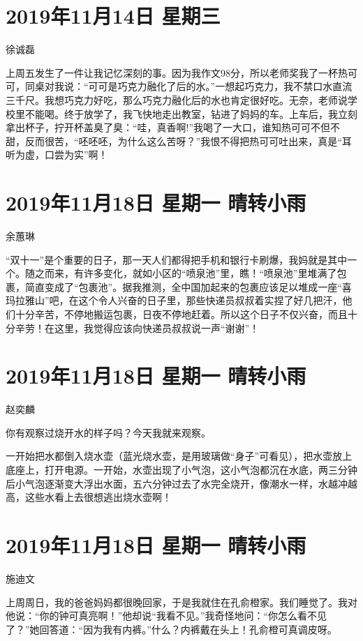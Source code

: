 \section{2019年11月14日 星期三}

徐诚磊

上周五发生了一件让我记忆深刻的事。因为我作文98分，所以老师奖我了一杯热可可，同桌对我说：``可可是巧克力融化了后的水。''一想起巧克力，我不禁口水直流三千尺。我想巧克力好吃，那么巧克力融化后的水也肯定很好吃。无奈，老师说学校里不能喝。终于放学了，我飞快地走出教室，钻进了妈妈的车。上车后，我立刻拿出杯子，拧开杯盖臭了臭：``哇，真香啊!''我喝了一大口，谁知热可可不但不甜，反而很苦，``呸呸呸，为什么这么苦呀？''我恨不得把热可可吐出来，真是``耳听为虚，口尝为实''啊！

\section{2019年11月18日 星期一 晴转小雨}

余蕙琳

``双十一''是个重要的日子，那一天人们都得把手机和银行卡刷爆，我妈就是其中一个。随之而来，有许多变化，就如小区的``喷泉池''里，瞧！``喷泉池''里堆满了包裹，简直变成了``包裹池''。据我推测，全中国加起来的包裹应该足以堆成一座``喜玛拉雅山''吧，在这个令人兴奋的日子里，那些快递员叔叔着实捏了好几把汗，他们十分辛苦，不停地搬运包裹，日夜不停地赶着。所以这个日子不仅兴奋，而且十分辛劳！在这里，我觉得应该向快递员叔叔说一声``谢谢''！

\section{2019年11月18日 星期一 晴转小雨}

赵奕麟

你有观察过烧开水的样子吗？今天我就来观察。

一开始把水都倒入烧水壶（蓝光烧水壶，是用玻璃做``身子''可看见），把水壶放上底座上，打开电源。一开始，水壶出现了小气泡，这小气泡都沉在水底，两三分钟后小气泡逐渐变大浮出水面，五六分钟过去了水完全烧开，像潮水一样，水越冲越高，这些水看上去很想逃出烧水壶啊！

\section{2019年11月18日 星期一 晴转小雨}

施迪文

上周周日，我的爸爸妈妈都很晚回家，于是我就住在孔俞橙家。我们睡觉了。我对他说：``你的钟可真亮啊！''他却说``我看不见。''我奇怪地问：``你怎么看不见了？''她回答道：``因为我有内裤。''什么？内裤戴在头上！孔俞橙可真调皮呀。

